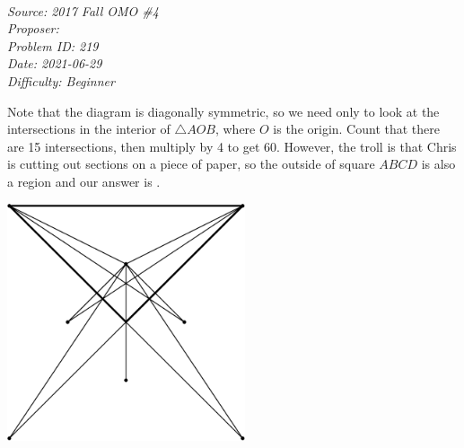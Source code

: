 \SSbreak\\
\emph{Source: 2017 Fall OMO \#4}\\
\emph{Proposer: \Pnjoy}\\ %
\emph{Problem ID: 219}\\
\emph{Date: 2021-06-29}\\
\emph{Difficulty: Beginner}\\
\SSbreak

\bigskip

\begin{solution}\hfil\medskip
  
	Note that the diagram is diagonally symmetric, so we need only to look at the intersections 
	in the interior of $\triangle AOB$, where $O$ is the origin. Count that there are 15 intersections, 
	then multiply by 4 to get 60. However, the troll is that Chris is cutting out sections on a piece of paper, 
	so the outside of square $ABCD$ is also a region and our answer is .

	\begin{center}\includegraphics[width=7cm,height=7cm]{Sections/Files/16-1-2.png}\end{center}
\end{solution}\bigskip
